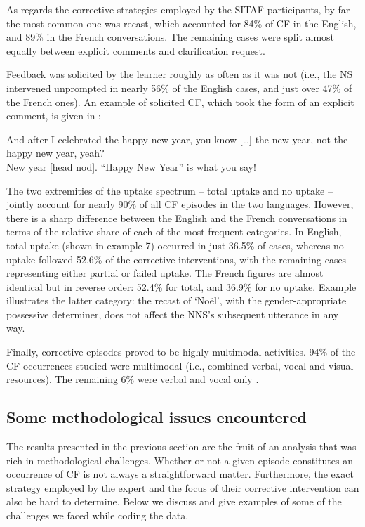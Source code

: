 \documentclass[output=paper,colorlinks,citecolor=brown,modfonts,nonflat]{../langscibook}
\begin{document}
As regards the corrective strategies employed by the SITAF participants, by far the most common one was recast, which accounted for 84\% of CF in the English, and 89\% in the French conversations. The remaining cases were split almost equally between explicit comments and clarification request. 

Feedback was solicited by the learner roughly as often as it was not (i.e., the NS intervened unprompted in nearly 56\% of the English cases, and just over 47\% of the French ones). An example of solicited CF, which took the form of an explicit comment, is given in :

\ea\label{ex:scheuer:8}
{\NNS} {And} {after} {I} {celebrated} {the} {happy} {new} {year,} {you} {know} {[…]} {the} {new} {year,} {not} {the} {happy} {new} {year,} {yeah?}\\
{\NS} {New} {year} [head nod]. {“Happy} {New} {Year”} {is} {what} {you} {say!}
\z

The two extremities of the uptake spectrum – total uptake and no uptake – jointly account for nearly 90\% of all CF episodes in the two languages. However, there is a sharp difference between the English and the French conversations in terms of the relative share of each of the most frequent categories. In English, total uptake (shown in example 7) occurred in just 36.5\% of cases, whereas no uptake followed 52.6\% of the corrective interventions, with the remaining cases representing either partial or failed uptake. The French figures are almost identical but in reverse order: 52.4\% for total, and 36.9\% for no uptake. Example  illustrates the latter category: the recast of ‘Noël’, with the gender-appropriate possessive determiner, does not affect the NNS’s subsequent utterance in any way.

Finally, corrective episodes proved to be highly multimodal activities. 94\% of the CF occurrences studied were multimodal (i.e., combined verbal, vocal and visual resources). The remaining 6\% were verbal and vocal only \citep{DebrasEtAl2015}. 

\subsection{Some methodological issues encountered}\label{sec:scheuer:4.3}

The results presented in the previous section are the fruit of an analysis that was rich in methodological challenges. Whether or not a given episode constitutes an occurrence of CF is not always a straightforward matter. Furthermore, the exact strategy employed by the expert and the focus of their corrective intervention can also be hard to determine. Below we discuss and give examples of some of the challenges we faced while coding the data.
\end{document}
